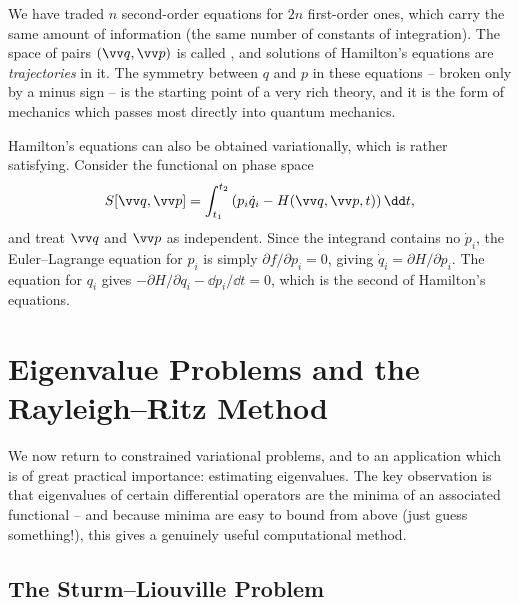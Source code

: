 We have traded $n$ second-order equations for $2n$ first-order ones, which carry the same amount of information (the same number of constants of integration). The space of pairs $(\vv q, \vv p)$ is called , and solutions of Hamilton's equations are \emph{trajectories} in it. The symmetry between $q$ and $p$ in these equations -- broken only by a minus sign -- is the starting point of a very rich theory, and it is the form of mechanics which passes most directly into quantum mechanics.

\begin{remark}
	Hamilton's equations can also be obtained variationally, which is rather satisfying. Consider the functional on phase space
	$$
	S[\vv q, \vv p] = \int_{t_1}^{t_2}\left(p_i \dot q_i - H(\vv q, \vv p, t)\right)\dd t,
	$$
	and treat $\vv q$ and $\vv p$ as independent. Since the integrand contains no $\dot p_i$, the Euler--Lagrange equation for $p_i$ is simply $\partial f/\partial p_i = 0$, giving $\dot q_i = \partial H/\partial p_i$. The equation for $q_i$ gives $-\partial H/\partial q_i - \dd p_i/\dd t = 0$, which is the second of Hamilton's equations.
\end{remark}

\section{Eigenvalue Problems and the Rayleigh--Ritz Method}\label{sec:rayleigh}

We now return to constrained variational problems, and to an application which is of great practical importance: estimating eigenvalues. The key observation is that eigenvalues of certain differential operators are the minima of an associated functional -- and because minima are easy to bound from above (just guess something!), this gives a genuinely useful computational method.

\subsection{The Sturm--Liouville Problem}

